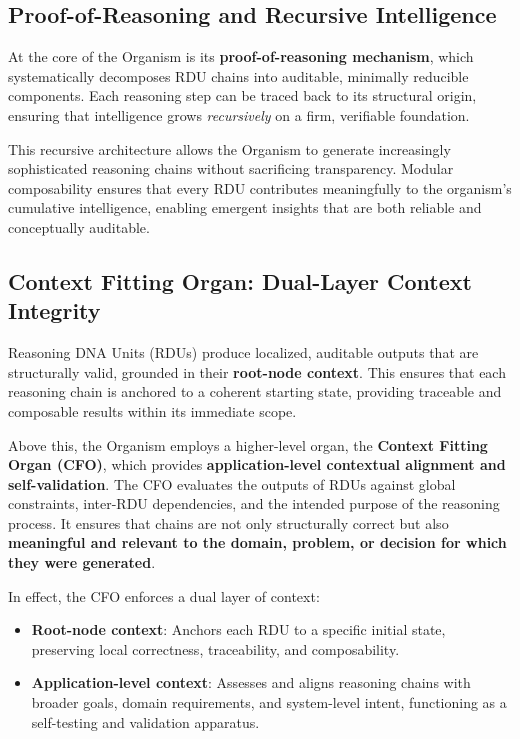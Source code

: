 \documentclass[12pt]{article}
\begin{document}
\subsection{Proof-of-Reasoning and Recursive Intelligence}

At the core of the Organism is its \textbf{proof-of-reasoning mechanism}, which systematically decomposes RDU chains into auditable, minimally reducible components. Each reasoning step can be traced back to its structural origin, ensuring that intelligence grows \textit{recursively} on a firm, verifiable foundation.  

This recursive architecture allows the Organism to generate increasingly sophisticated reasoning chains without sacrificing transparency. Modular composability ensures that every RDU contributes meaningfully to the organism’s cumulative intelligence, enabling emergent insights that are both reliable and conceptually auditable.

\subsection{Context Fitting Organ: Dual-Layer Context Integrity}

Reasoning DNA Units (RDUs) produce localized, auditable outputs that are structurally valid, grounded in their \textbf{root-node context}. This ensures that each reasoning chain is anchored to a coherent starting state, providing traceable and composable results within its immediate scope.  

Above this, the Organism employs a higher-level organ, the \textbf{Context Fitting Organ (CFO)}, which provides \textbf{application-level contextual alignment and self-validation}. The CFO evaluates the outputs of RDUs against global constraints, inter-RDU dependencies, and the intended purpose of the reasoning process. It ensures that chains are not only structurally correct but also \textbf{meaningful and relevant to the domain, problem, or decision for which they were generated}.  

In effect, the CFO enforces a dual layer of context:  

\begin{itemize}  
    \item \textbf{Root-node context}: Anchors each RDU to a specific initial state, preserving local correctness, traceability, and composability.  
    \item \textbf{Application-level context}: Assesses and aligns reasoning chains with broader goals, domain requirements, and system-level intent, functioning as a self-testing and validation apparatus.  
\end{itemize}  
\end{document}
